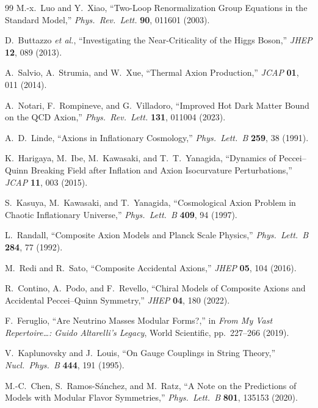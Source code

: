 \documentclass[11pt,a4paper]{article}
\begin{document}
\begin{thebibliography}{99}
M.-x.~Luo and Y.~Xiao, ``Two-Loop Renormalization Group Equations in the Standard Model,'' \emph{Phys.\ Rev.\ Lett.} \textbf{90}, 011601 (2003).

D.~Buttazzo \textit{et al.}, ``Investigating the Near-Criticality of the Higgs Boson,'' \emph{JHEP} \textbf{12}, 089 (2013).

A.~Salvio, A.~Strumia, and W.~Xue, ``Thermal Axion Production,'' \emph{JCAP} \textbf{01}, 011 (2014).

A.~Notari, F.~Rompineve, and G.~Villadoro, ``Improved Hot Dark Matter Bound on the QCD Axion,'' \emph{Phys.\ Rev.\ Lett.} \textbf{131}, 011004 (2023).

A.~D.~Linde, ``Axions in Inflationary Cosmology,'' \emph{Phys.\ Lett.\ B} \textbf{259}, 38 (1991).

K.~Harigaya, M.~Ibe, M.~Kawasaki, and T.~T.~Yanagida, ``Dynamics of Peccei--Quinn Breaking Field after Inflation and Axion Isocurvature Perturbations,'' \emph{JCAP} \textbf{11}, 003 (2015).

S.~Kasuya, M.~Kawasaki, and T.~Yanagida, ``Cosmological Axion Problem in Chaotic Inflationary Universe,'' \emph{Phys.\ Lett.\ B} \textbf{409}, 94 (1997).

L.~Randall, ``Composite Axion Models and Planck Scale Physics,'' \emph{Phys.\ Lett.\ B} \textbf{284}, 77 (1992).

M.~Redi and R.~Sato, ``Composite Accidental Axions,'' \emph{JHEP} \textbf{05}, 104 (2016).

R.~Contino, A.~Podo, and F.~Revello, ``Chiral Models of Composite Axions and Accidental Peccei--Quinn Symmetry,'' \emph{JHEP} \textbf{04}, 180 (2022).

F.~Feruglio, ``Are Neutrino Masses Modular Forms?,'' in \emph{From My Vast Repertoire\dots: Guido Altarelli's Legacy}, World Scientific, pp.~227--266 (2019).

V.~Kaplunovsky and J.~Louis, ``On Gauge Couplings in String Theory,'' \emph{Nucl.\ Phys.\ B} \textbf{444}, 191 (1995).

M.-C.~Chen, S.~Ramos-S\'anchez, and M.~Ratz, ``A Note on the Predictions of Models with Modular Flavor Symmetries,'' \emph{Phys.\ Lett.\ B} \textbf{801}, 135153 (2020).


\end{thebibliography}
\end{document}

